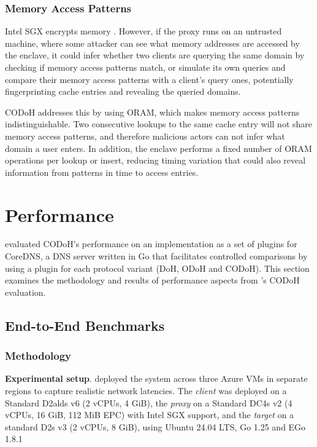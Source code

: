 \documentclass[a4paper]{article}
\begin{document}
\subsubsection{Memory Access Patterns}

Intel SGX encrypts memory \citep{cryptoeprint:2016/086}. However, if the proxy runs on an untrusted machine, where some attacker can see what memory addresses are accessed by the enclave, it could infer whether two clients are querying the same domain by checking if memory access patterns match, or simulate its own queries and compare their memory access patterns with a client's query ones, potentially fingerprinting cache entries and revealing the queried domains.

CODoH \citep{niroula2026codoh} addresses this by using ORAM, which makes memory access patterns indistinguishable. Two consecutive lookups to the same cache entry will not share memory access patterns, and therefore malicious actors can not infer what domain a user enters. In addition, the enclave performs a fixed number of ORAM operations per lookup or insert, reducing timing variation that could also reveal information from patterns in time to access entries.

\section{Performance}

\citet{niroula2026codoh} evaluated CODoH's performance on an implementation as a set of plugins for CoreDNS, a DNS server written in Go \citep{belamaric2019learning} that facilitates controlled comparisons by using a plugin for each protocol variant (DoH, ODoH and CODoH). This section examines the methodology and results of performance aspects from \citet{niroula2026codoh}'s CODoH evaluation.

\subsection{End-to-End Benchmarks}

\subsubsection{Methodology}
\label{sec:e2emeth}

\textbf{Experimental setup}. \citet{niroula2026codoh} deployed the system across three Azure VMs in separate regions to capture realistic network latencies. The \textit{client} was deployed on a Standard D2alds v6 (2 vCPUs, 4 GiB), the \textit{proxy} on a Standard DC4s v2 (4 vCPUs, 16 GiB,
112 MiB EPC) with Intel SGX support, and the \textit{target} on a standard D2s v3 (2 vCPUs, 8 GiB), using Ubuntu 24.04 LTS, Go 1.25 and EGo 1.8.1
\end{document}
